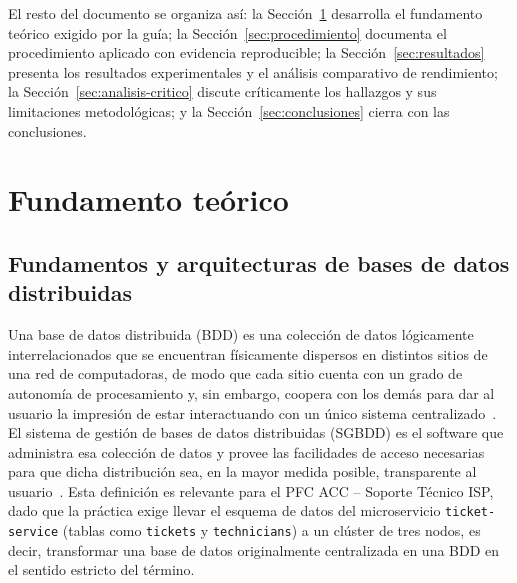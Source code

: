 \documentclass[11pt,a4paper]{article}
\begin{document}
El resto del documento se organiza as\'i: la Secci\'on~\ref{sec:teoria}
desarrolla el fundamento te\'orico exigido por la gu\'ia; la
Secci\'on~\ref{sec:procedimiento} documenta el procedimiento aplicado con
evidencia reproducible; la Secci\'on~\ref{sec:resultados} presenta los
resultados experimentales y el an\'alisis comparativo de rendimiento; la
Secci\'on~\ref{sec:analisis-critico} discute cr\'iticamente los hallazgos y
sus limitaciones metodol\'ogicas; y la Secci\'on~\ref{sec:conclusiones} cierra
con las conclusiones.

\section{Fundamento te\'orico}
\label{sec:teoria}

\subsection{Fundamentos y arquitecturas de bases de datos distribuidas}

Una base de datos distribuida (BDD) es una colecci\'on de datos l\'ogicamente
interrelacionados que se encuentran f\'isicamente dispersos en distintos sitios
de una red de computadoras, de modo que cada sitio cuenta con un grado de
autonom\'ia de procesamiento y, sin embargo, coopera con los dem\'as para dar al
usuario la impresi\'on de estar interactuando con un \'unico sistema
centralizado~\cite{ozsu2020,date2000}. El sistema de gesti\'on de bases de datos
distribuidas (SGBDD) es el software que administra esa colecci\'on de datos y
provee las facilidades de acceso necesarias para que dicha distribuci\'on sea,
en la mayor medida posible, transparente al usuario~\cite{ozsu2020,date2000}. Esta
definici\'on es relevante para el PFC ACC -- Soporte T\'ecnico ISP, dado que la
pr\'actica exige llevar el esquema de datos del microservicio
\texttt{ticket-service} (tablas como \texttt{tickets} y
\texttt{technicians}) a un cl\'uster de tres nodos, es decir,
transformar una base de datos originalmente centralizada en una BDD en el
sentido estricto del t\'ermino.
\end{document}
